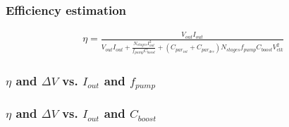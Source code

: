\documentclass[aspectratio=169]{beamer}
\begin{document}
\begin{frame}
    \frametitle{Efficiency estimation}
    \begin{align}
        \eta = \frac{V_{out} I_{out}}{V_{out}I_{out} + \frac{N_{stages} I_{out}^2}{f_{pump} C_{boost}} + (C_{par_{int}} + C_{par_{drv}}) N_{stages} f_{pump} C_{boost} V_{clk}^2}\nonumber
    \end{align}
\end{frame}

\begin{frame}
    \frametitle{$\eta$ and $\Delta V$ vs. $I_{out}$ and $f_{pump}$}

\end{frame}

\begin{frame}
    \frametitle{$\eta$ and $\Delta V$ vs. $I_{out}$ and $C_{boost}$}

\end{frame}
\end{document}
